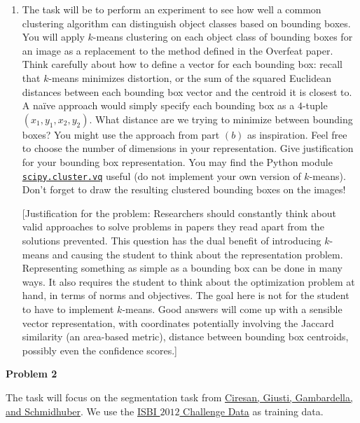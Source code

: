 \documentclass[12pt]{article}
\newcommand{\probnum}[1]
{\large {\bf Problem {#1}}}
\begin{document}
\begin{enumerate}

\item The task will be to perform an experiment to see how well a common clustering algorithm can distinguish object classes based on bounding boxes. You will apply $k$-means clustering on each object class of bounding boxes for an image as a replacement to the method defined in the Overfeat paper. Think carefully about how to define a vector for each bounding box: recall that $k$-means minimizes distortion, or the sum of the squared Euclidean distances between each bounding box vector and the centroid it is closest to. A na{\"i}ve approach would simply specify each bounding box as a $4$-tuple $(x_1, y_1, x_2, y_2)$. What distance are we trying to minimize between bounding boxes? You might use the approach from part $(b)$ as inspiration. Feel free to choose the number of dimensions in your representation. Give justification for your bounding box representation. You may find the Python module \href{http://docs.scipy.org/doc/scipy/reference/cluster.vq.html}{\texttt{scipy.cluster.vq}} useful (do not implement your own version of $k$-means). Don't forget to draw the resulting clustered bounding boxes on the images!

[Justification for the problem: Researchers should constantly think about valid approaches to solve problems in papers they read apart from the solutions prevented. This question has the dual benefit of introducing $k$-means and causing the student to think about the representation problem. Representing something as simple as a bounding box can be done in many ways. It also requires the student to think about the optimization problem at hand, in terms of norms and objectives. The goal here is not for the student to have to implement $k$-means. Good answers will come up with a sensible vector representation, with coordinates potentially involving the Jaccard similarity (an area-based metric), distance between bounding box centroids, possibly even the confidence scores.]


\end{enumerate}

\probnum{2}

The task will focus on the segmentation task from \href{http://people.idsia.ch/~juergen/nips2012.pdf}{Ciresan, Giusti, Gambardella, and Schmidhuber}. We use the \href{http://brainiac2.mit.edu/isbi_challenge/content/isbi-2012-workshop-results}{ISBI $2012$ Challenge Data} as training data.
\end{document}
